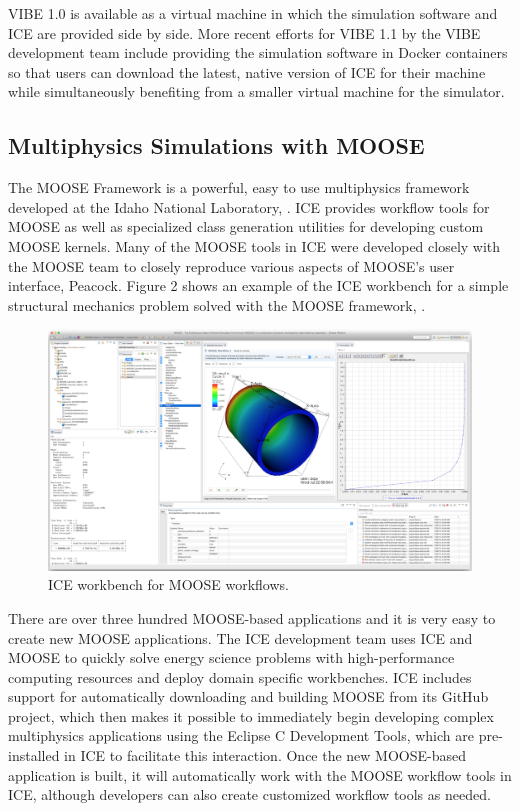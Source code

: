 VIBE 1.0 is available as a virtual machine in which the simulation
software and ICE are provided side by side. More recent efforts for VIBE
1.1 by the VIBE development team include providing the simulation
software in Docker containers so that users can download the latest,
native version of ICE for their machine while simultaneously benefiting
from a smaller virtual machine for the simulator.

\subsection{Multiphysics Simulations with
MOOSE}\label{multiphysics-simulations-with-moose}

The MOOSE Framework is a powerful, easy to use multiphysics framework
developed at the Idaho National Laboratory, \cite{gaston_moose:_2009}. ICE
provides workflow tools for MOOSE as well as specialized class
generation utilities for developing custom MOOSE kernels. Many of the
MOOSE tools in ICE were developed closely with the MOOSE team to closely
reproduce various aspects of MOOSE's user interface, Peacock. Figure 2
shows an example of the ICE workbench for a simple structural mechanics
problem solved with the MOOSE framework, \cite{mccaskey_scientific_2015}.

\begin{figure}[htbp]
\centering
\includegraphics[width=\textwidth]{images/ice-moose.png}
\caption{ICE workbench for MOOSE workflows.}
\end{figure}

There are over three hundred MOOSE-based applications and it is very
easy to create new MOOSE applications. The ICE development team uses ICE
and MOOSE to quickly solve energy science problems with high-performance
computing resources and deploy domain specific workbenches. ICE includes
support for automatically downloading and building MOOSE from its GitHub
project, which then makes it possible to immediately begin developing
complex multiphysics applications using the Eclipse C Development Tools,
which are pre-installed in ICE to facilitate this interaction. Once the
new MOOSE-based application is built, it will automatically work with
the MOOSE workflow tools in ICE, although developers can also create
customized workflow tools as needed.

